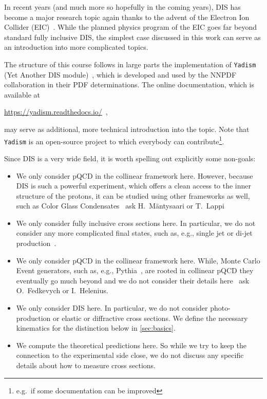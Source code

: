 In recent years (and much more so hopefully in the coming years), DIS has become a major research topic again thanks to the advent of the Electron Ion Collider (EIC)~\cite{Accardi:2012qut}.
While the planned physics program of the EIC goes far beyond standard fully inclusive DIS, the simplest case discussed in this work can serve as an introduction into more complicated topics.

The structure of this course follows in large parts the implementation of \texttt{Yadism} (Yet Another DIS module)~\cite{Candido:2024rkr,barontini_2026_18758473}, which is developed and used by the NNPDF collaboration in their PDF determinations.
The online documentation, which is available at
\begin{center}
    \url{https://yadism.readthedocs.io/} \,,
\end{center}
may serve as additional, more technical introduction into the topic.
Note that \texttt{Yadism} is an open-source project to which everybody can contribute\footnote{e.g.\ if some documentation can be improved}.

Since DIS is a very wide field, it is worth spelling out explicitly some non-goals:
\begin{itemize}
    \item We only consider pQCD in the collinear framework here.
        However, because DIS is such a powerful experiment, which offers a clean access to the inner structure of the protons, it can be studied using other frameworks as well, such as Color Glass Condensates~\cite{Bertilsson:2026vtu,Casuga:2026xxt} \textrightarrow{} ask H.~Mäntysaari or T.~Lappi
    \item We only consider fully inclusive cross sections here. %
        In particular, we do not consider any more complicated final states, such as, e.g., single jet or di-jet production~\cite{H1:2014cbm,Helenius:2026odp}.
    \item We only consider pQCD in the collinear framework here.
        While, Monte Carlo Event generators, such as, e.g., Pythia~\cite{Bierlich:2022pfr}, are rooted in collinear pQCD they eventually go much beyond and we do not consider their details here~\cite{Helenius:2026odp} \textrightarrow{} ask O.~Fedkevych or I.~Helenius.
    \item We only consider DIS here.
        In particular, we do not consider photo-production or elastic or diffractive cross sections.
        We define the necessary kinematics for the distinction below in \cref{sec:basics}.
    \item We compute the theoretical predictions here.
        So while we try to keep the connection to the experimental side close, we do not discuss any specific details about how to measure cross sections.
\end{itemize}

